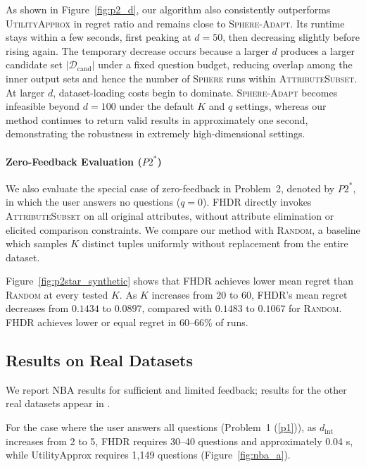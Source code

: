 \documentclass[conference]{IEEEtran}
\theoremstyle{definition}
\theoremstyle{plain}
\newcommand{\technicalreport}{\iftoggle{LinkTechnicalReport}{\href{https://github.com/JunyuLiao/High-dimensional-Regret-Minimization/blob/main/docs/TechnicalReport.pdf}{technical report}}{technical report}}
\begin{document}
As shown in Figure~\ref{fig:p2_d}, our algorithm also consistently outperforms \textsc{UtilityApprox} in regret ratio and remains close to \textsc{Sphere-Adapt}. Its runtime stays within a few seconds, first peaking at $d=50$, then decreasing slightly before rising again. The temporary decrease occurs because a larger $d$ produces a larger candidate set $|\mathcal{D}_\text{cand}|$ under a fixed question budget, reducing overlap among the inner output sets and hence the number of \textsc{Sphere} runs within \textsc{AttributeSubset}. At larger $d$, dataset-loading costs begin to dominate. \textsc{Sphere-Adapt} becomes infeasible beyond $d=100$ under the default $K$ and $q$ settings, whereas our method continues to return valid results in approximately one second, demonstrating the robustness in extremely high-dimensional settings.

\paragraph*{Zero-Feedback Evaluation ($P2^{*}$)}
We also evaluate the special case of zero-feedback in Problem~2, denoted by $P2^{*}$, in which the user answers no questions ($q=0$). FHDR directly invokes \textsc{AttributeSubset} on all original attributes, without attribute elimination or elicited comparison constraints. We compare our method with \textsc{Random}, a baseline which samples $K$ distinct tuples uniformly without replacement from the entire dataset.

Figure~\ref{fig:p2star_synthetic} shows that FHDR achieves lower mean regret than \textsc{Random} at every tested $K$. As $K$ increases from $20$ to $60$, FHDR’s mean regret decreases from $0.1434$ to $0.0897$, compared with $0.1483$ to $0.1067$ for \textsc{Random}. FHDR achieves lower or equal regret in $60$--$66\%$ of runs.

\subsection{Results on Real Datasets}
We report NBA results for sufficient and limited feedback; results for the other real datasets appear in \iftoggle{TechnicalReport}{Section~\ref{appen:real} of the \technicalreport}{Appendix~\ref{appen:real}}.

For the case where the user answers all questions (Problem~1 (\ref{p1})), as \(d_{\text{int}}\) increases from 2 to 5, FHDR requires 30–40 questions and approximately 0.04 s, while UtilityApprox requires 1,149 questions (Figure~\ref{fig:nba_a}).
\end{document}
